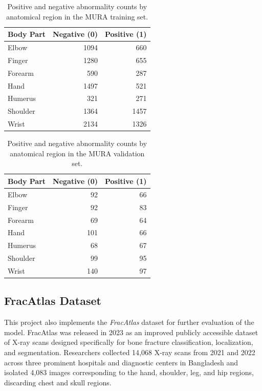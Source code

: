 \documentclass[conference]{IEEEtran}
\begin{document}
\begin{table}[h]
\centering
\caption{Training Set}
\begin{tabular}{lrr}
\hline
\textbf{Body Part} & \textbf{Negative (0)} & \textbf{Positive (1)} \\
\hline
Elbow    & 1094 & 660 \\
Finger   & 1280 & 655 \\
Forearm  & 590  & 287 \\
Hand     & 1497 & 521 \\
Humerus  & 321  & 271 \\
Shoulder & 1364 & 1457 \\
Wrist    & 2134 & 1326 \\
\hline
\end{tabular}
\caption{Positive and negative abnormality counts by anatomical region in the MURA training set.}
\label{tab:training_distribution}
\end{table}


\begin{table}[h]
\centering
\caption{Validation Set}
\begin{tabular}{lrr}
\hline
\textbf{Body Part} & \textbf{Negative (0)} & \textbf{Positive (1)} \\
\hline
Elbow    & 92  & 66 \\
Finger   & 92  & 83 \\
Forearm  & 69  & 64 \\
Hand     & 101 & 66 \\
Humerus  & 68  & 67 \\
Shoulder & 99  & 95 \\
Wrist    & 140 & 97 \\
\hline
\end{tabular}
\caption{Positive and negative abnormality counts by anatomical region in the MURA validation set.}
\label{tab:validation_distribution}
\end{table}

\subsection{FracAtlas Dataset}

This project also implements the \textit{FracAtlas} dataset for further evaluation of the model. FracAtlas was released in 2023 as an improved publicly accessible dataset of X-ray scans designed specifically for bone fracture classification, localization, and segmentation. Researchers collected 14{,}068 X-ray scans from 2021 and 2022 across three prominent hospitals and diagnostic centers in Bangladesh and isolated 4{,}083 images corresponding to the hand, shoulder, leg, and hip regions, discarding chest and skull regions.
\end{document}
